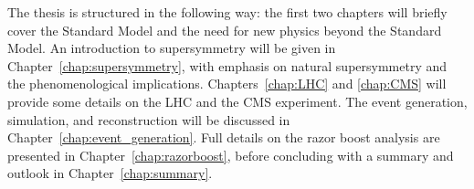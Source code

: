 The thesis is structured in the following way: the first two chapters will briefly cover the
Standard Model and the need for new physics beyond the Standard Model. An introduction to
supersymmetry will be given in Chapter~\ref{chap:supersymmetry}, with emphasis on natural
supersymmetry and the phenomenological implications. Chapters~\ref{chap:LHC} and \ref{chap:CMS} will
provide some details on the LHC and the CMS experiment. The event generation, simulation, and
reconstruction will be discussed in Chapter~\ref{chap:event_generation}. Full details on the razor
boost analysis are presented in Chapter~\ref{chap:razorboost}, before concluding with a summary and
outlook in Chapter~\ref{chap:summary}.



